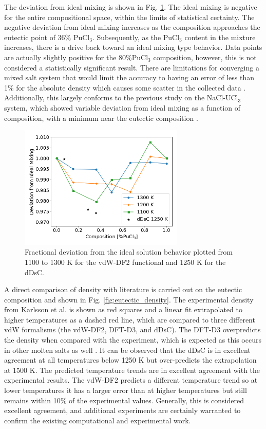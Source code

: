 \documentclass[review]{elsarticle}
\begin{document}
The deviation from ideal mixing is shown in Fig. \ref{fig:deviation}. The ideal mixing is negative for the entire compositional space, within the limits of statistical certainty. The negative deviation from ideal mixing increases as the composition approaches the eutectic point of 36\% PuCl$_3$. Subsequently, as the PuCl$_3$ content in the mixture increases, there is a drive back toward an ideal mixing type behavior. Data points are actually slightly positive for the 80\%PuCl$_3$ composition, however, this is not considered a statistically significant result. There are limitations for converging a mixed salt system that would limit the accuracy to having an error of less than 1\% for the absolute density which causes some scatter in the collected data \cite{ANDERSSON2022153836}. Additionally, this largely conforms to the previous study on the NaCl-UCl$_3$ system, which showed variable deviation from ideal mixing as a function of composition, with a minimum near the eutectic composition \cite{ANDERSSON2022153836}. 

\begin{figure}[h!]
 \centering
 \includegraphics[width=0.7\textwidth]{Diviation_from_ideal_mixing.png} 
 \caption{Fractional deviation from the ideal solution behavior plotted from 1100 to 1300 K for the vdW-DF2 functional and 1250 K for the dDsC.}
 \label{fig:deviation}
\end{figure}

A direct comparison of density with literature is carried out on the eutectic composition and shown in Fig. \ref{fig:eutectic_density}. The experimental density from Karlsson et al. \cite{karlsson2022synthesis} is shown as red squares and a linear fit extrapolated to higher temperatures as a dashed red line, which are compared to three different vdW formalisms (the vdW-DF2, DFT-D3, and dDsC). The DFT-D3 overpredicts the density when compared with the experiment, which is expected as this occurs in other molten salts as well \cite{duemmler_liclkcl, duemmler_naclmgcl}. It can be observed that the dDsC is in excellent agreement at all temperatures below 1250 K but over-predicts the extrapolation at 1500 K.  The predicted temperature trends are in excellent agreement with the experimental results. The vdW-DF2 predicts a different temperature trend so at lower temperatures it has a larger error than at higher temperatures but still remains within 10\% of the experimental values. Generally, this is considered excellent agreement, and additional experiments are certainly warranted to confirm the existing computational and experimental work.
\end{document}
